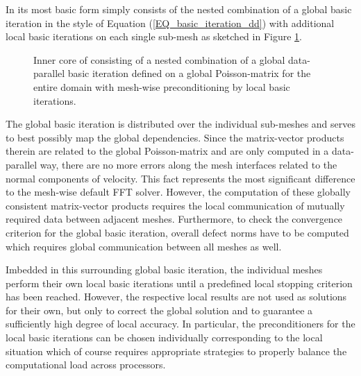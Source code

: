 {In its most basic form \scarc{} simply consists of the nested combination of a global basic iteration in the style of Equation (\ref{EQ_basic_iteration_dd}) with additional local basic iterations on each single sub-mesh as sketched in Figure \ref{FIG_default_basic}. 

\begin{figure}[h]
\begin{center}

\caption{Inner core of \scarc{} consisting of a nested combination of a global data-parallel basic iteration defined on a global Poisson-matrix for the entire domain with mesh-wise preconditioning by local basic iterations.} 
\label{FIG_default_basic}
\end{center}
\end{figure}

The global basic iteration is distributed over the individual sub-meshes and serves to best possibly map the global dependencies. Since the matrix-vector products therein are related to the global Poisson-matrix and are only computed in a data-parallel way, there are no more errors along the mesh interfaces related to the normal components of velocity. This fact represents the most significant difference to the mesh-wise default FFT solver. However, the computation of these globally consistent matrix-vector products requires the local communication of mutually required data between adjacent meshes. Furthermore, to check the convergence criterion for the global basic iteration, overall defect norms have to be computed which requires global communication between all meshes as well.

Imbedded in this surrounding global basic iteration, the individual meshes perform their own local basic iterations until a predefined local stopping criterion has been reached. However, the respective local results are not used as solutions for their own, but only to correct the global solution and to guarantee a sufficiently high degree of local accuracy.  In particular, the preconditioners for the local basic iterations can be chosen individually corresponding to the local situation which of course requires appropriate strategies to properly balance the computational load across processors.

}
